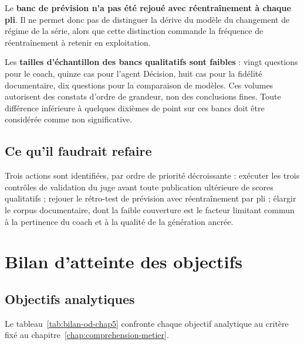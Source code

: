 Le \textbf{banc de prévision n'a pas été rejoué avec réentraînement à chaque pli}. Il ne permet donc pas de distinguer la dérive du modèle du changement de régime de la série, alors que cette distinction commande la fréquence de réentraînement à retenir en exploitation.

Les \textbf{tailles d'échantillon des bancs qualitatifs sont faibles} : vingt questions pour le coach, quinze cas pour l'agent Décision, huit cas pour la fidélité documentaire, dix questions pour la comparaison de modèles. Ces volumes autorisent des constats d'ordre de grandeur, non des conclusions fines. Toute différence inférieure à quelques dixièmes de point sur ces bancs doit être considérée comme non significative.

\subsection{Ce qu'il faudrait refaire}

Trois actions sont identifiées, par ordre de priorité décroissante : exécuter les trois contrôles de validation du juge avant toute publication ultérieure de scores qualitatifs ; rejouer le rétro-test de prévision avec réentraînement par pli ; élargir le corpus documentaire, dont la faible couverture est le facteur limitant commun à la pertinence du coach et à la qualité de la génération ancrée.

\section{Bilan d'atteinte des objectifs}
\label{sec:bilan}

\subsection{Objectifs analytiques}

Le tableau~\ref{tab:bilan-od-chap5} confronte chaque objectif analytique au critère fixé au chapitre~\ref{chap:comprehension-metier}.

\begingroup
\setlength{\tabcolsep}{3pt}
\renewcommand{\arraystretch}{1.15}
\small

